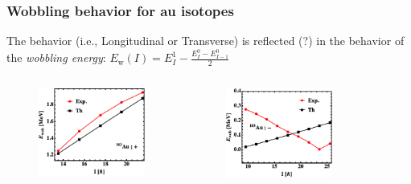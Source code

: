 \documentclass{beamer}
\begin{document}
\begin{frame}
    \frametitle{Wobbling behavior for au isotopes}
    The behavior (i.e., Longitudinal or Transverse) is reflected (?) in the behavior of the \emph{wobbling energy}: $E_\text{w}(I)=E_I^1-\frac{E_I^0-E_{I-1}^0}{2}$
    \begin{columns}
    \begin{column}{.33\textwidth}
    \begin{figure}
        \centering
        \includegraphics[scale=0.3]{figs/wobbling_183_positive.png}
    \end{figure}
    \end{column}
    \begin{column}{.33\textwidth}
    \begin{figure}
        \centering
        \includegraphics[scale=0.3]{figs/wobbling_183_negative.png}
    \end{figure}
    \end{column}
    \begin{column}{.33\textwidth}
    \begin{figure}

\end{figure}
\end{column}
\end{columns}
\end{frame}
\end{document}
